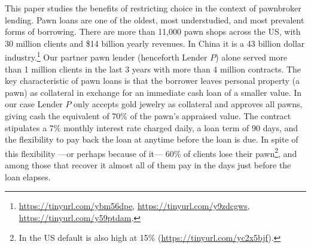 \documentclass[oneside,11pt]{article}
\begin{document}
This paper studies the benefits of restricting choice in the context of pawnbroker lending. Pawn loans are one of the oldest, most understudied, and most prevalent forms of borrowing. There are more than 11,000 pawn shops across the US, with 30 million clients and \$14 billion yearly revenues. In China it is a 43 billion dollar industry.\footnote{\url{https://tinyurl.com/ybm56dpe}, \url{https://tinyurl.com/y9zdcgws}, \url{https://tinyurl.com/y59ptdam}.} Our partner pawn lender (henceforth Lender $P$) alone served more than 1 million clients in the last 3 years with more than 4 million contracts. The key characteristic of pawn loans is that the borrower leaves personal property (a pawn) as collateral in exchange for an immediate cash loan of a smaller value. In our case Lender $P$ only accepts gold jewelry as collateral and approves all pawns, giving cash the equivalent of 70\% of the pawn's appraised value. The contract stipulates a 7\% monthly interest rate charged daily, a loan term of 90 days, and the flexibility to pay back the loan at anytime before the loan is due. In spite of this flexibility ---or perhaps because of it--- 60\% of clients lose their pawn\footnote{In the US default is also high at 15\% (\url{https://tinyurl.com/yc2x5bjf}).}, and among those that recover it almost all of them pay in the days just before the loan elapses.




\end{document}
